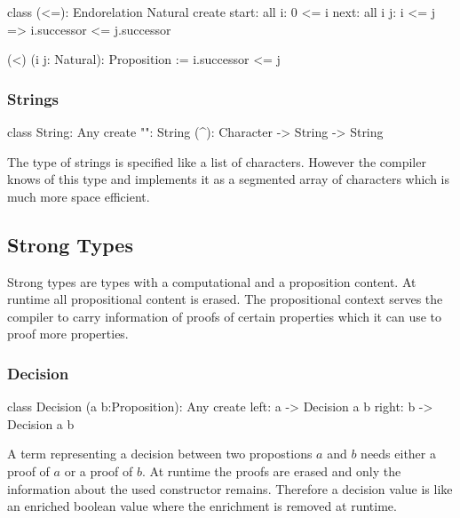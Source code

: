 \begin{alba}
  class
    (<=): Endorelation Natural
  create
    start: all i: 0 <= i
    next:  all i j: i <= j => i.successor <= j.successor

  (<) (i j: Natural): Proposition := i.successor <= j
\end{alba}
\vskip 2mm


\subsubsection{Strings}

\begin{alba}
  class
    String: Any
  create
    "": String
    (^): Character -> String -> String
\end{alba}

The type of strings is specified like a list of characters. However the
compiler knows of this type and implements it as a segmented array of
characters which is much more space efficient.
\newline




\subsection{Strong Types}
\label{sec:prelude-strong-types}

Strong types are types with a computational and a proposition content. At
runtime all propositional content is erased. The propositional context serves
the compiler to carry information of proofs of certain properties which it can
use to proof more properties.


\subsubsection{Decision}
%
\begin{alba}
  class
    Decision (a b:Proposition): Any
  create
    left:  a -> Decision a b
    right: b -> Decision a b
\end{alba}

A term representing a decision between two propostions $a$ and $b$ needs
either a proof of $a$ or a proof of $b$. At runtime the proofs are erased and
only the information about the used constructor remains. Therefore a decision
value is like an enriched boolean value where the enrichment is removed at
runtime.
\newline




